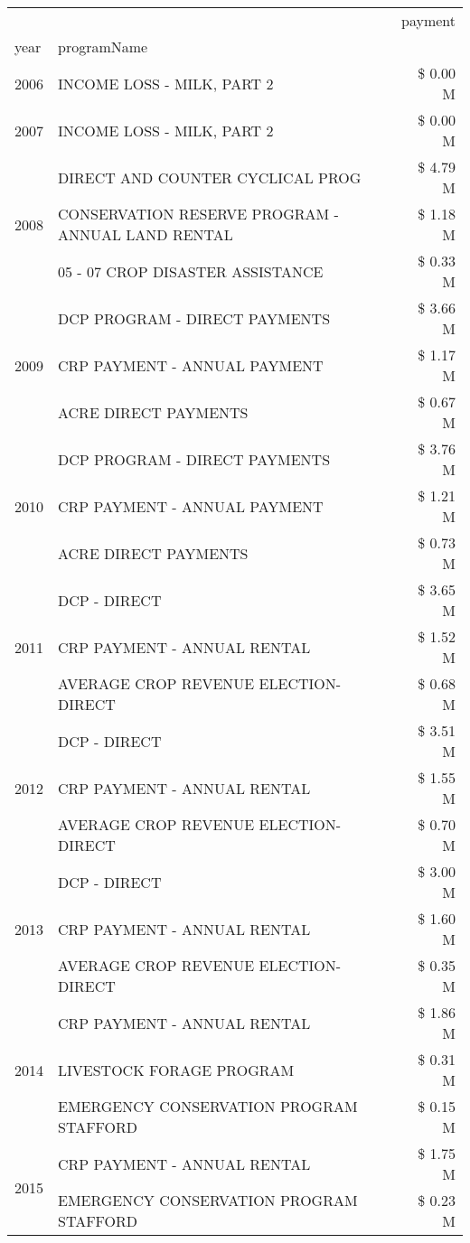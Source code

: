 \begin{tabular}{llr}
\toprule
 &  & payment \\
year & programName &  \\
\midrule
2006 & INCOME LOSS - MILK, PART 2 & \$ 0.00 M \\
\cline{1-3}
2007 & INCOME LOSS - MILK, PART 2 & \$ 0.00 M \\
\cline{1-3}
\multirow[t]{3}{*}{2008} & DIRECT AND COUNTER CYCLICAL PROG & \$ 4.79 M \\
 & CONSERVATION RESERVE PROGRAM - ANNUAL LAND RENTAL & \$ 1.18 M \\
 & 05 - 07 CROP DISASTER ASSISTANCE & \$ 0.33 M \\
\cline{1-3}
\multirow[t]{3}{*}{2009} & DCP PROGRAM - DIRECT PAYMENTS & \$ 3.66 M \\
 & CRP PAYMENT - ANNUAL PAYMENT & \$ 1.17 M \\
 & ACRE DIRECT PAYMENTS & \$ 0.67 M \\
\cline{1-3}
\multirow[t]{3}{*}{2010} & DCP PROGRAM - DIRECT PAYMENTS & \$ 3.76 M \\
 & CRP PAYMENT - ANNUAL PAYMENT & \$ 1.21 M \\
 & ACRE DIRECT PAYMENTS & \$ 0.73 M \\
\cline{1-3}
\multirow[t]{3}{*}{2011} & DCP - DIRECT & \$ 3.65 M \\
 & CRP PAYMENT - ANNUAL RENTAL & \$ 1.52 M \\
 & AVERAGE CROP REVENUE ELECTION-DIRECT & \$ 0.68 M \\
\cline{1-3}
\multirow[t]{3}{*}{2012} & DCP - DIRECT & \$ 3.51 M \\
 & CRP PAYMENT - ANNUAL RENTAL & \$ 1.55 M \\
 & AVERAGE CROP REVENUE ELECTION-DIRECT & \$ 0.70 M \\
\cline{1-3}
\multirow[t]{3}{*}{2013} & DCP - DIRECT & \$ 3.00 M \\
 & CRP PAYMENT - ANNUAL RENTAL & \$ 1.60 M \\
 & AVERAGE CROP REVENUE ELECTION-DIRECT & \$ 0.35 M \\
\cline{1-3}
\multirow[t]{3}{*}{2014} & CRP PAYMENT - ANNUAL RENTAL & \$ 1.86 M \\
 & LIVESTOCK FORAGE PROGRAM & \$ 0.31 M \\
 & EMERGENCY CONSERVATION PROGRAM STAFFORD & \$ 0.15 M \\
\cline{1-3}
\multirow[t]{3}{*}{2015} & CRP PAYMENT - ANNUAL RENTAL & \$ 1.75 M \\
 & EMERGENCY CONSERVATION PROGRAM STAFFORD & \$ 0.23 M \\

\end{tabular}
